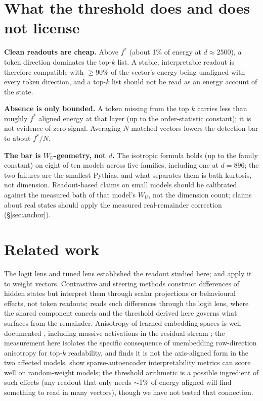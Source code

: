 \documentclass[11pt]{article}
\newcommand{\WU}{W_U}
\newcommand{\fstar}{f^{*}}
\begin{document}
\section{What the threshold does and does not license}
\label{sec:implications}

\textbf{Clean readouts are cheap.} Above $\fstar$ (about 1\% of
energy at $d \approx 2500$), a token direction dominates the top-$k$
list. A stable, interpretable readout is therefore compatible with
$\geq 90\%$ of the vector's energy being unaligned with every token
direction, and a top-$k$ list should not be read as an energy
account of the state.

\textbf{Absence is only bounded.} A token missing from the top $k$
carries less than roughly $\fstar$ aligned energy at that layer (up
to the order-statistic constant); it is not evidence of zero signal.
Averaging $N$ matched vectors lowers the detection bar to about
$\fstar/N$.

\textbf{The bar is $\WU$-geometry, not $d$.} The isotropic formula
holds (up to the family constant) on eight of ten models across five
families, including one at $d{=}896$; the two failures are the
smallest Pythias, and what separates them is bath kurtosis, not
dimension. Readout-based claims on small models should be calibrated
against the measured bath of that model's $\WU$, not the dimension
count; claims about real states should apply the measured
real-remainder correction (\S\ref{sec:anchor}).

\section{Related work}

The logit lens \citep{nostalgebraist2020} and tuned lens
\citep{belrose2023} established the readout studied here;
\citet{geva2022} and \citet{dar2022} apply it to weight vectors.
Contrastive and steering methods \citep{zou2023,turner2023,rimsky2024}
construct differences of hidden states but interpret them through
scalar projections or behavioural effects, not token readouts;
\citet{tuomi2026contrastive} reads such differences through the logit
lens, where the shared component cancels and the threshold derived
here governs what surfaces from the remainder.
Anisotropy of learned embedding spaces is well documented
\citep{ethayarajh2019,timkey2021,puccetti2022}, including massive
activations in the residual stream \citep{sun2024}; the measurement
here isolates the specific consequence of unembedding row-direction
anisotropy for top-$k$ readability, and finds it is not the
axis-aligned form in the two affected models. \citet{heap2025} show
sparse-autoencoder interpretability metrics can score well on
random-weight models; the threshold arithmetic is a possible
ingredient of such effects (any readout that only needs $\sim$1\% of
energy aligned will find something to read in many vectors), though
we have not tested that connection.
\end{document}
